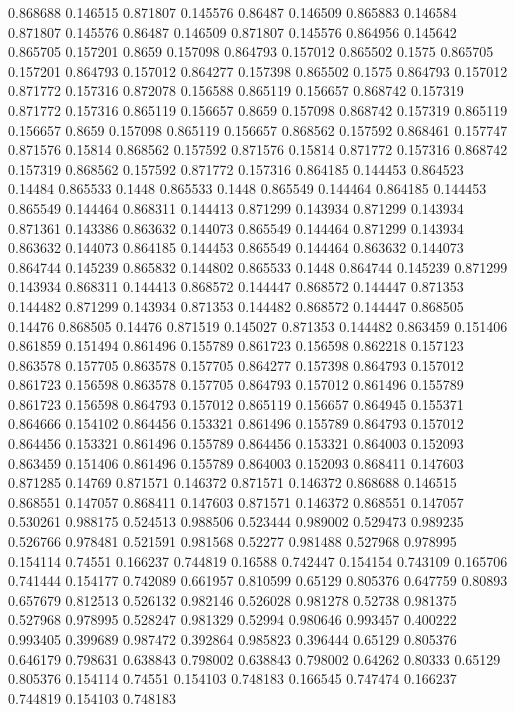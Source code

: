 0.868688 0.146515
0.871807 0.145576
0.86487 0.146509
0.865883 0.146584
0.871807 0.145576
0.86487 0.146509
0.871807 0.145576
0.864956 0.145642
0.865705 0.157201
0.8659 0.157098
0.864793 0.157012
0.865502 0.1575
0.865705 0.157201
0.864793 0.157012
0.864277 0.157398
0.865502 0.1575
0.864793 0.157012
0.871772 0.157316
0.872078 0.156588
0.865119 0.156657
0.868742 0.157319
0.871772 0.157316
0.865119 0.156657
0.8659 0.157098
0.868742 0.157319
0.865119 0.156657
0.8659 0.157098
0.865119 0.156657
0.868562 0.157592
0.868461 0.157747
0.871576 0.15814
0.868562 0.157592
0.871576 0.15814
0.871772 0.157316
0.868742 0.157319
0.868562 0.157592
0.871772 0.157316
0.864185 0.144453
0.864523 0.14484
0.865533 0.1448
0.865533 0.1448
0.865549 0.144464
0.864185 0.144453
0.865549 0.144464
0.868311 0.144413
0.871299 0.143934
0.871299 0.143934
0.871361 0.143386
0.863632 0.144073
0.865549 0.144464
0.871299 0.143934
0.863632 0.144073
0.864185 0.144453
0.865549 0.144464
0.863632 0.144073
0.864744 0.145239
0.865832 0.144802
0.865533 0.1448
0.864744 0.145239
0.871299 0.143934
0.868311 0.144413
0.868572 0.144447
0.868572 0.144447
0.871353 0.144482
0.871299 0.143934
0.871353 0.144482
0.868572 0.144447
0.868505 0.14476
0.868505 0.14476
0.871519 0.145027
0.871353 0.144482
0.863459 0.151406
0.861859 0.151494
0.861496 0.155789
0.861723 0.156598
0.862218 0.157123
0.863578 0.157705
0.863578 0.157705
0.864277 0.157398
0.864793 0.157012
0.861723 0.156598
0.863578 0.157705
0.864793 0.157012
0.861496 0.155789
0.861723 0.156598
0.864793 0.157012
0.865119 0.156657
0.864945 0.155371
0.864666 0.154102
0.864456 0.153321
0.861496 0.155789
0.864793 0.157012
0.864456 0.153321
0.861496 0.155789
0.864456 0.153321
0.864003 0.152093
0.863459 0.151406
0.861496 0.155789
0.864003 0.152093
0.868411 0.147603
0.871285 0.14769
0.871571 0.146372
0.871571 0.146372
0.868688 0.146515
0.868551 0.147057
0.868411 0.147603
0.871571 0.146372
0.868551 0.147057
0.530261 0.988175
0.524513 0.988506
0.523444 0.989002
0.529473 0.989235
0.526766 0.978481
0.521591 0.981568
0.52277 0.981488
0.527968 0.978995
0.154114 0.74551
0.166237 0.744819
0.16588 0.742447
0.154154 0.743109
0.165706 0.741444
0.154177 0.742089
0.661957 0.810599
0.65129 0.805376
0.647759 0.80893
0.657679 0.812513
0.526132 0.982146
0.526028 0.981278
0.52738 0.981375
0.527968 0.978995
0.528247 0.981329
0.52994 0.980646
0.993457 0.400222
0.993405 0.399689
0.987472 0.392864
0.985823 0.396444
0.65129 0.805376
0.646179 0.798631
0.638843 0.798002
0.638843 0.798002
0.64262 0.80333
0.65129 0.805376
0.154114 0.74551
0.154103 0.748183
0.166545 0.747474
0.166237 0.744819
0.154103 0.748183
